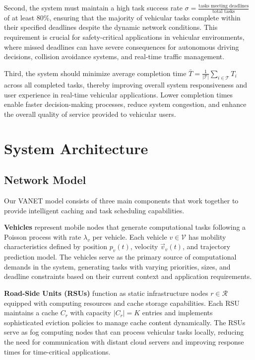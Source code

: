 \documentclass[11pt]{article}
\begin{document}
Second, the system must maintain a high task success rate $\sigma = \frac{\text{tasks meeting deadlines}}{\text{total tasks}}$ of at least 80\%, ensuring that the majority of vehicular tasks complete within their specified deadlines despite the dynamic network conditions. This requirement is crucial for safety-critical applications in vehicular environments, where missed deadlines can have severe consequences for autonomous driving decisions, collision avoidance systems, and real-time traffic management.

Third, the system should minimize average completion time $\bar{T} = \frac{1}{|\mathcal{T}|} \sum_{i \in \mathcal{T}} T_i$ across all completed tasks, thereby improving overall system responsiveness and user experience in real-time vehicular applications. Lower completion times enable faster decision-making processes, reduce system congestion, and enhance the overall quality of service provided to vehicular users.

\section{System Architecture}

\subsection{Network Model}

Our VANET model consists of three main components that work together to provide intelligent caching and task scheduling capabilities.

\textbf{Vehicles} represent mobile nodes that generate computational tasks following a Poisson process with rate $\lambda_v$ per vehicle. Each vehicle $v \in \mathcal{V}$ has mobility characteristics defined by position $p_v(t)$, velocity $\vec{v}_v(t)$, and trajectory prediction model. The vehicles serve as the primary source of computational demands in the system, generating tasks with varying priorities, sizes, and deadline constraints based on their current context and application requirements.

\textbf{Road-Side Units (RSUs)} function as static infrastructure nodes $r \in \mathcal{R}$ equipped with computing resources and cache storage capabilities. Each RSU maintains a cache $C_r$ with capacity $|C_r| = K$ entries and implements sophisticated eviction policies to manage cache content dynamically. The RSUs serve as fog computing nodes that can process vehicular tasks locally, reducing the need for communication with distant cloud servers and improving response times for time-critical applications.
\end{document}
